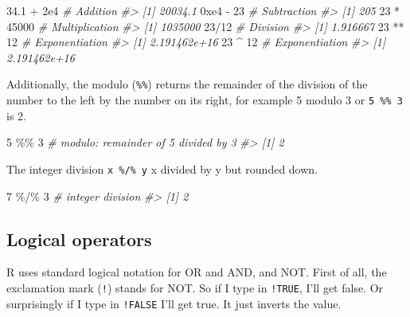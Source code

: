 \documentclass[
]{book}
\newenvironment{Shaded}{\begin{snugshade}}{\end{snugshade}}
\newcommand{\CommentTok}[1]{\textcolor[rgb]{0.56,0.35,0.01}{\textit{#1}}}
\newcommand{\DecValTok}[1]{\textcolor[rgb]{0.00,0.00,0.81}{#1}}
\newcommand{\FloatTok}[1]{\textcolor[rgb]{0.00,0.00,0.81}{#1}}
\newcommand{\SpecialCharTok}[1]{\textcolor[rgb]{0.00,0.00,0.00}{#1}}
\begin{document}
\begin{Shaded}
\begin{Highlighting}[]
\FloatTok{34.1} \SpecialCharTok{+} \FloatTok{2e4} \CommentTok{\# Addition}
\CommentTok{\#\textgreater{} [1] 20034.1}
\DecValTok{0xe4} \SpecialCharTok{{-}} \DecValTok{23}  \CommentTok{\# Subtraction}
\CommentTok{\#\textgreater{} [1] 205}
\DecValTok{23} \SpecialCharTok{*} \DecValTok{45000} \CommentTok{\# Multiplication}
\CommentTok{\#\textgreater{} [1] 1035000}
\DecValTok{23}\SpecialCharTok{/}\DecValTok{12}      \CommentTok{\# Division}
\CommentTok{\#\textgreater{} [1] 1.916667}
\DecValTok{23} \SpecialCharTok{**} \DecValTok{12}   \CommentTok{\# Exponentiation}
\CommentTok{\#\textgreater{} [1] 2.191462e+16}
\DecValTok{23} \SpecialCharTok{\^{}} \DecValTok{12}    \CommentTok{\# Exponentiation}
\CommentTok{\#\textgreater{} [1] 2.191462e+16}
\end{Highlighting}
\end{Shaded}

Additionally, the modulo (\texttt{\%\%}) returns the remainder of the division of the number to the left by the number on its right, for example 5 modulo 3 or \texttt{5\ \%\%\ 3} is 2.

\begin{Shaded}
\begin{Highlighting}[]
\DecValTok{5} \SpecialCharTok{\%\%} \DecValTok{3}   \CommentTok{\# modulo: remainder of 5 divided by 3 }
\CommentTok{\#\textgreater{} [1] 2}
\end{Highlighting}
\end{Shaded}

The integer division \texttt{x\ \%/\%\ y} x divided by y but rounded down.

\begin{Shaded}
\begin{Highlighting}[]
\DecValTok{7} \SpecialCharTok{\%/\%} \DecValTok{3}   \CommentTok{\# integer division}
\CommentTok{\#\textgreater{} [1] 2}
\end{Highlighting}
\end{Shaded}

\hypertarget{logical-operators}{%
\subsection{Logical operators}\label{logical-operators}}

R uses standard logical notation for OR and AND, and NOT. First of all, the exclamation mark (\texttt{!}) stands for NOT. So if I type in \texttt{!TRUE}, I'll get false. Or surprisingly if I type in \texttt{!FALSE} I'll get true. It just inverts the value.
\end{document}
